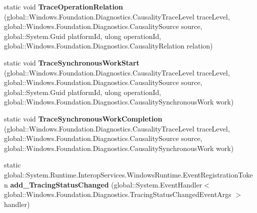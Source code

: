 \begin{DoxyCompactItemize}
\item 
\mbox{\label{class_windows_1_1_foundation_1_1_diagnostics_1_1_async_causality_tracer_aeac1886be232699acc5bbcfe37ed2ab2}} 
static void {\bfseries Trace\+Operation\+Relation} (global\+::\+Windows.\+Foundation.\+Diagnostics.\+Causality\+Trace\+Level trace\+Level, global\+::\+Windows.\+Foundation.\+Diagnostics.\+Causality\+Source source, global\+::\+System.\+Guid platform\+Id, ulong operation\+Id, global\+::\+Windows.\+Foundation.\+Diagnostics.\+Causality\+Relation relation)
\item 
\mbox{\label{class_windows_1_1_foundation_1_1_diagnostics_1_1_async_causality_tracer_a335d95a15aa1675ebbb7a8451d669e80}} 
static void {\bfseries Trace\+Synchronous\+Work\+Start} (global\+::\+Windows.\+Foundation.\+Diagnostics.\+Causality\+Trace\+Level trace\+Level, global\+::\+Windows.\+Foundation.\+Diagnostics.\+Causality\+Source source, global\+::\+System.\+Guid platform\+Id, ulong operation\+Id, global\+::\+Windows.\+Foundation.\+Diagnostics.\+Causality\+Synchronous\+Work work)
\item 
\mbox{\label{class_windows_1_1_foundation_1_1_diagnostics_1_1_async_causality_tracer_a0fdd51a55dbceaaf56df6af1635b618f}} 
static void {\bfseries Trace\+Synchronous\+Work\+Completion} (global\+::\+Windows.\+Foundation.\+Diagnostics.\+Causality\+Trace\+Level trace\+Level, global\+::\+Windows.\+Foundation.\+Diagnostics.\+Causality\+Source source, global\+::\+Windows.\+Foundation.\+Diagnostics.\+Causality\+Synchronous\+Work work)
\item 
\mbox{\label{class_windows_1_1_foundation_1_1_diagnostics_1_1_async_causality_tracer_a25cca79b997614c5cff342a6177b0cc7}} 
static global\+::\+System.\+Runtime.\+Interop\+Services.\+Windows\+Runtime.\+Event\+Registration\+Token {\bfseries add\+\_\+\+Tracing\+Status\+Changed} (global\+::\+System.\+Event\+Handler$<$ global\+::\+Windows.\+Foundation.\+Diagnostics.\+Tracing\+Status\+Changed\+Event\+Args $>$ handler)
\item 
\mbox{\label{class_windows_1_1_foundation_1_1_diagnostics_1_1_async_causality_tracer_abdb7cc6e31beb6735567af4b413f9eea}} 

\end{DoxyCompactItemize}
